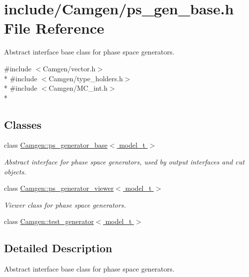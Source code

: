 \hypertarget{a00717}{\section{include/\-Camgen/ps\-\_\-gen\-\_\-base.h File Reference}
\label{a00717}
}


Abstract interface base class for phase space generators.  


{\ttfamily \#include $<$Camgen/vector.\-h$>$}\\*
{\ttfamily \#include $<$Camgen/type\-\_\-holders.\-h$>$}\\*
{\ttfamily \#include $<$Camgen/\-M\-C\-\_\-int.\-h$>$}\\*
\subsection*{Classes}
\begin{DoxyCompactItemize}
\item 
class \hyperlink{a00442}{Camgen\-::ps\-\_\-generator\-\_\-base$<$ model\-\_\-t $>$}
\begin{DoxyCompactList}\small\item\em Abstract interface for phase space generators, used by output interfaces and cut objects. \end{DoxyCompactList}\item 
class \hyperlink{a00444}{Camgen\-::ps\-\_\-generator\-\_\-viewer$<$ model\-\_\-t $>$}
\begin{DoxyCompactList}\small\item\em Viewer class for phase space generators. \end{DoxyCompactList}\item 
class \hyperlink{a00529}{Camgen\-::test\-\_\-generator$<$ model\-\_\-t $>$}
\end{DoxyCompactItemize}


\subsection{Detailed Description}
Abstract interface base class for phase space generators. 